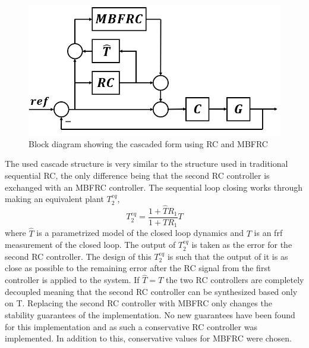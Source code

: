 \documentclass[journal]{IEEEtran}
\begin{document}
\begin{figure}
    \centering
    \includegraphics[width=0.8\linewidth]{figures/simple_RC_MBFRC/MBFRC_RC_2.png}
    \caption{Block diagram showing the cascaded form using RC and MBFRC}
    \label{fig:BLKcascade}
\end{figure}

The used cascade structure is very similar to the structure used in traditional sequential RC, the only difference being that the second RC controller is exchanged with an MBFRC controller. The sequential loop closing works through making an equivalent plant $T_2^{eq}$,
\begin{equation}
    T_2^{eq} = \frac{1+\hat TR_1}{1+TR_1}T
\end{equation}
where $\hat T$ is a parametrized model of the closed loop dynamics and $T$ is an frf measurement of the closed loop. The output of $T_2^{eq}$ is taken as the error for the second RC controller. The design of this $T_2^{eq}$ is such that the output of it is as close as possible to the remaining error after the RC signal from the first controller is applied to the system. If $\hat T=T$ the two RC controllers are completely decoupled meaning that the second RC controller can be synthesized based only on T. 
Replacing the second RC controller with MBFRC only changes the stability guarantees of the implementation. No new guarantees have been found for this implementation and as such a conservative RC controller was implemented. In addition to this, conservative values for MBFRC were chosen.
\end{document}
